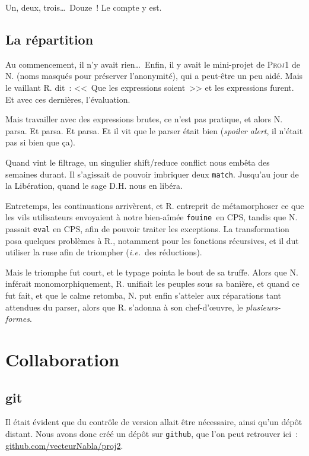 \documentclass[a4, 12pt, titlepage]{scrartcl}
\newcommand{\ie}[0]{\textit{i.e.}}
\newcommand{\fouine}[0]{\texttt{fouine}}
\begin{document}
Un, deux, trois\ldots\ Douze~! Le compte y est.

\subsection{La répartition}\label{subsec:22}

Au commencement, il n'y avait rien\ldots\ Enfin, il y avait le
mini-projet de \textsc{Proj1} de N. (noms masqués pour préserver
l'anonymité), qui a peut-être un peu aidé. Mais le vaillant R. dit~:
<<~Que les expressions soient~>> et les expressions furent. Et avec
ces dernières, l'évaluation.

Mais travailler avec des expressions brutes, ce n'est pas pratique, et
alors N. parsa. Et parsa. Et parsa. Et il vit que le parser était bien
(\emph{spoiler alert}, il n'était pas si bien que ça).

Quand vint le filtrage, un singulier shift/reduce conflict nous
embêta des semaines durant. Il s'agissait de pouvoir imbriquer deux
\texttt{match}. Jusqu'au jour de la Libération, quand le
sage D.H. nous en libéra.

Entretemps, les continuations arrivèrent, et R. entreprit de
métamorphoser ce que les vils utilisateurs envoyaient à notre
bien-aîmée \fouine\ en CPS, tandis que N. passait \texttt{eval} en
CPS, afin de pouvoir traiter les exceptions. La transformation posa
quelques problèmes à R., notamment pour les fonctions récursives, et
il dut utiliser la ruse afin de triompher (\ie\ des réductions).

Mais le triomphe fut court, et le typage pointa le bout de sa
truffe. Alors que N. inférait monomorphiquement, R. unifiait les
peuples sous sa banière, et quand ce fut fait, et que le calme
retomba, N. put enfin s'atteler aux réparations tant attendues du
parser, alors que R. s'adonna à son chef-d'œuvre, le \emph{plusieurs-formes}.

\section{Collaboration}\label{sec:3}

\subsection{git}\label{subsec:31}

Il était évident que du contrôle de version allait être nécessaire,
ainsi qu'un dépôt distant. Nous avons donc créé un dépôt sur
\texttt{github}, que l'on peut retrouver ici~:
\url{github.com/vecteurNabla/proj2}.
\end{document}
